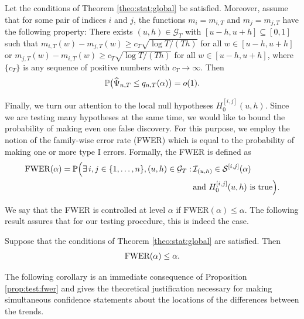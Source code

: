 \documentclass[a4paper,12pt]{article}
\begin{document}
\begin{prop}\label{prop:test:power}
Let the conditions  of Theorem \ref{theo:stat:global} be satisfied. Moreover, assume that for some pair of indices $i$ and $j$, the functions $m_ i = m_{i,T}$ and $m_ j = m_{j,T}$ have the following property: There exists $(u,h) \in \mathcal{G}_T$ with $[u-h,u+h] \subseteq [0,1]$ such that $m_{i,T}(w) - m_{j,T}(w) \ge c_T \sqrt{\log T/(Th)}$ for all $w \in [u-h,u+h]$ or $m_{j,T}(w) - m_{i,T}(w) \ge c_T \sqrt{\log T/(Th)}$ for all $w \in [u-h,u+h]$, where $\{c_T\}$ is any sequence of positive numbers with $c_T \rightarrow \infty$. Then 
\[ \mathbb{P} \big( \widehat{\Psi}_{n,T} \le q_{n,T}(\alpha) \big) = o(1). \]
\end{prop}


Finally, we turn our attention to the local null hypotheses $H_0^{[i, j]}(u, h)$. Since we are testing many hypotheses at the same time, we would like to bound the probability of making even one false discovery. For this purpose, we employ the notion of the family-wise error rate (FWER) which is equal to the probability of making one or more type I errors. Formally, the FWER is defined as
\begin{align*} 
\text{FWER}(\alpha) = \mathbb{P} \Big(\exists \,  i, j \in \{1, \ldots, n \}, (u, h) \in \mathcal{G}_T : & \, \mathcal{I}_{(u, h)} \in \mathcal{S}^{[i, j]}(\alpha) \\ & \, \text{and } H_0^{[i, j]}(u, h) \text { is true}\Big).
\end{align*}

We say that the FWER is controlled at level $\alpha$ if $\text{FWER}(\alpha) \leq \alpha$. The following result assures that for our testing procedure, this is indeed the case.

\begin{prop}\label{prop:test:fwer}
Suppose that the conditions  of Theorem \ref{theo:stat:global} are satisfied. Then 
\[ \textnormal{FWER}(\alpha) \leq \alpha. \]
\end{prop}


The following corollary is an immediate consequence of Proposition \ref{prop:test:fwer} and gives the theoretical justification necessary for making simultaneous confidence statements about the locations of the differences between the trends.
\end{document}
